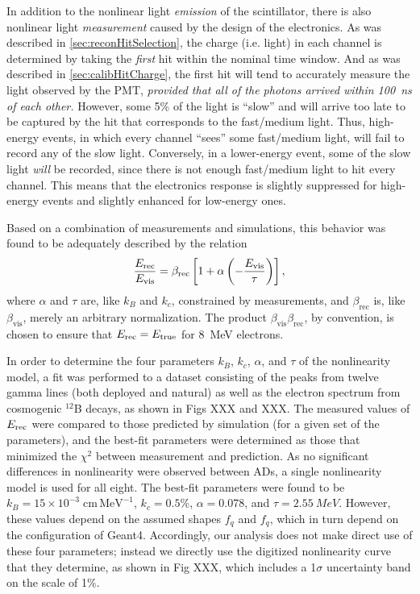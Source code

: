 \documentclass[../thesis.tex]{subfiles}
\begin{document}
In addition to the nonlinear light \emph{emission} of the scintillator, there is
also nonlinear light \emph{measurement} caused by the design of the
electronics. As was described in \autoref{sec:reconHitSelection}, the charge
(i.e. light) in each channel is determined by taking the \emph{first} hit within
the nominal time window. And as was described in \autoref{sec:calibHitCharge},
the first hit will tend to accurately measure the light observed by the PMT,
\emph{provided that all of the photons arrived within 100~ns of each other.}
However, some 5\% of the light is ``slow'' and will arrive too late to be
captured by the hit that corresponds to the fast/medium light. Thus, high-energy
events, in which every channel ``sees'' some fast/medium light, will fail to
record any of the slow light. Conversely, in a lower-energy event, some of the
slow light \emph{will} be recorded, since there is not enough fast/medium light
to hit every channel. This means that the electronics response is slightly
suppressed for high-energy events and slightly enhanced for low-energy ones.

Based on a combination of measurements and simulations, this behavior was found
to be adequately described by the relation
\begin{equation*}
  \frac{E_\mathrm{rec}}{E_\mathrm{vis}} = \beta_{\mathrm{rec}}\left[ 1 + \alpha \left( - \frac{E_\mathrm{vis}}{\tau} \right) \right],
\end{equation*}
where $\alpha$ and $\tau$ are, like $k_B$ and $k_c$, constrained by
measurements, and $\beta_{\mathrm{rec}}$ is, like $\beta_{\mathrm{vis}}$, merely
an arbitrary normalization. The product
$\beta_{\mathrm{vis}}\beta_{\mathrm{rec}}$, by convention, is chosen to ensure
that $E_\mathrm{rec} = E_\mathrm{true}$ for 8~MeV electrons.

In order to determine the four parameters $k_B$, $k_c$, $\alpha$, and $\tau$ of
the nonlinearity model, a fit was performed to a dataset consisting of the peaks
from twelve gamma lines (both deployed and natural) as well as the electron
spectrum from cosmogenic $^{12}$B decays, as shown in Figs XXX and XXX. The
measured values of $E_\mathrm{rec}$ were compared to those predicted by simulation (for a
given set of the parameters), and the best-fit parameters were determined as
those that minimized the $\chi^2$ between measurement and prediction. As no
significant differences in nonlinearity were observed between ADs, a single
nonlinearity model is used for all eight. The best-fit parameters were found to
be $k_B = 15 \times 10^{-3}\;\mathrm{cm\, MeV^{-1}}$, $k_c = 0.5\%$, $\alpha =
0.078$, and $\tau = \SI{2.55}{MeV}$. However, these values depend on the assumed
shapes $f_q$ and $f_q$, which in turn depend on the configuration of
Geant4. Accordingly, our analysis does not make direct use of these four
parameters; instead we directly use the digitized nonlinearity curve that they
determine, as shown in Fig XXX, which includes a 1$\sigma$ uncertainty band on
the scale of 1\%.
\end{document}
